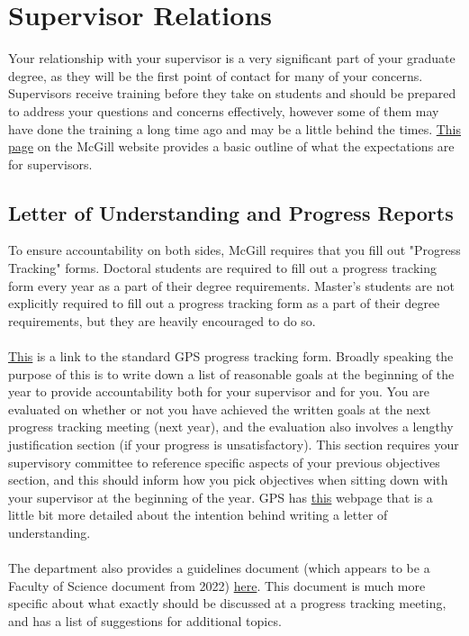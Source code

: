 
\chapter{Supervisor Relations}

    Your relationship with your supervisor is a very significant part of your graduate degree, as they will be the first point of contact for many of your concerns. Supervisors receive training before they take on students and should be prepared to address your questions and concerns effectively, however some of them may have done the training a long time ago and may be a little behind the times. \href{https://www.mcgill.ca/gradsupervision/supervisors/mcgill-expectations-graduate-supervision}{This page} on the McGill website provides a basic outline of what the expectations are for supervisors. 

    \section{Letter of Understanding and Progress Reports}
        
        To ensure accountability on both sides, McGill requires that you fill out "Progress Tracking" forms. Doctoral students are required to fill out a progress tracking form every year as a part of their degree requirements. Master's students are not explicitly required to fill out a progress tracking form as a part of their degree requirements, but they are heavily encouraged to do so.
        \\\\
        \href{https://www.mcgill.ca/gps/files/gps/gps_graduate_student_research_progress_tracking_report_2025_fillable.pdf}{This} is a link to the standard GPS progress tracking form. Broadly speaking the purpose of this is to write down a list of reasonable goals at the beginning of the year to provide accountability both for your supervisor and for you. You are evaluated on whether or not you have achieved the written goals at the next progress tracking meeting (next year), and the evaluation also involves a lengthy justification section (if your progress is unsatisfactory). This section requires your supervisory committee to reference specific aspects of your previous objectives section, and this should inform how you pick objectives when sitting down with your supervisor at the beginning of the year. GPS has \href{https://www.mcgill.ca/gradsupervision/supervisees/discussing-expectations}{this} webpage that is a little bit more detailed about the intention behind writing a letter of understanding.
        \\\\
        The department also provides a guidelines document (which appears to be a Faculty of Science document from 2022) \href{https://www.physics.mcgill.ca/grads/lou22.pdf}{here}. This document is much more specific about what exactly should be discussed at a progress tracking meeting, and has a list of suggestions for additional topics.

